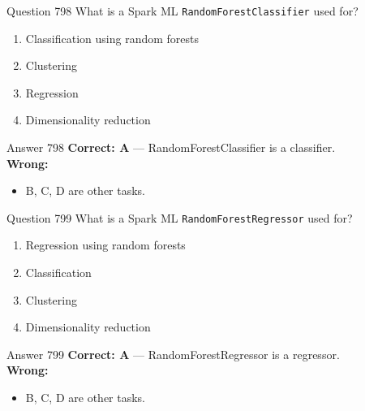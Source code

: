 \documentclass[aspectratio=169,11pt]{beamer}
\begin{document}
	\begin{frame}{Question 798}
		What is a Spark ML \texttt{RandomForestClassifier} used for?
		\begin{enumerate}[label=\Alph*.]
			\item Classification using random forests
			\item Clustering
			\item Regression
			\item Dimensionality reduction
		\end{enumerate}
	\end{frame}
	\begin{frame}{Answer 798}
		\textbf{Correct: A} --- RandomForestClassifier is a classifier.\\
		\vspace{0.5em}
		\textbf{Wrong:}
		\begin{itemize}
			\item B, C, D are other tasks.
		\end{itemize}
	\end{frame}
	
	\begin{frame}{Question 799}
		What is a Spark ML \texttt{RandomForestRegressor} used for?
		\begin{enumerate}[label=\Alph*.]
			\item Regression using random forests
			\item Classification
			\item Clustering
			\item Dimensionality reduction
		\end{enumerate}
	\end{frame}
	\begin{frame}{Answer 799}
		\textbf{Correct: A} --- RandomForestRegressor is a regressor.\\
		\vspace{0.5em}
		\textbf{Wrong:}
		\begin{itemize}
			\item B, C, D are other tasks.
		\end{itemize}
	\end{frame}
	
\end{document}

